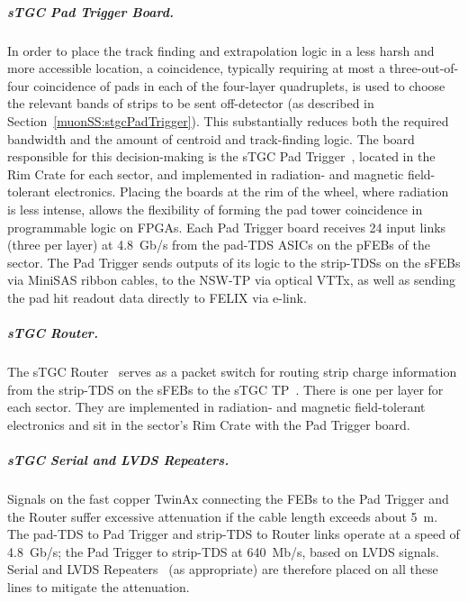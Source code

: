 \documentclass[cernpreprint, atlasdraft=false, UKenglish,british,orcidlogo, texmf, orcidlogo]{atlasdoc}
\begin{document}
\subparagraph{sTGC Pad Trigger Board.}
In order to place the track finding and extrapolation logic in a less harsh and more accessible location, a coincidence, typically requiring at most a three-out-of-four coincidence of pads in each of the four-layer quadruplets, is used to choose the relevant bands of strips to be sent off-detector (as described in Section~\ref{muonSS:stgcPadTrigger}).
This substantially reduces both the required bandwidth and the amount of centroid and track-finding logic.
The board responsible for this decision-making is the \gls{sTGC} Pad Trigger~\cite{NSWelx},
located in the Rim Crate for each sector, and implemented in radiation- and magnetic field-tolerant electronics.
Placing the boards at the rim of the wheel, where radiation is less intense, allows the flexibility of forming the pad tower coincidence in programmable logic on \glspl{FPGA}.
Each Pad Trigger board receives \num{24} input links (three per layer) at \SI{4.8}{Gb/\s} from the pad-\gls{TDS} \glspl{ASIC} on the \glspl{pFEB} of the sector.
The Pad Trigger sends outputs of its logic to the strip-\glspl{TDS} on the \glspl{sFEB} via MiniSAS ribbon cables, to the \gls{NSW-TP} via optical \gls{VTTx}, as well as sending the pad hit readout data directly to \gls{FELIX} via \gls{e-link}.
 
\subparagraph{sTGC Router.}
The \gls{sTGC} Router~\cite{router_7287804} serves as a packet switch for routing strip charge information from the strip-\gls{TDS} on the \glspl{sFEB} to the \gls{sTGC} \gls{TP}~\cite{NSWelx}. There is one per layer for each sector. They are implemented in radiation- and magnetic field-tolerant electronics and sit in the sector's Rim Crate with the Pad Trigger board.
 
\subparagraph{sTGC Serial and LVDS Repeaters.}
Signals on the fast copper TwinAx connecting the \glspl{FEB} to the Pad Trigger and the Router suffer excessive attenuation if the cable length exceeds about \SI{5}{\m}.
The pad-\gls{TDS} to Pad Trigger and strip-\gls{TDS} to Router links operate at a speed of \SI{4.8}{Gb/\s}; the Pad Trigger to strip-\gls{TDS} at \SI{640}{Mb/\s}, based on \gls{LVDS} signals.
Serial and  \gls{LVDS} Repeaters~\cite{ATL-MUON-PUB-2022-003} (as appropriate) are therefore placed on all these lines to mitigate the attenuation.
 
\end{document}
